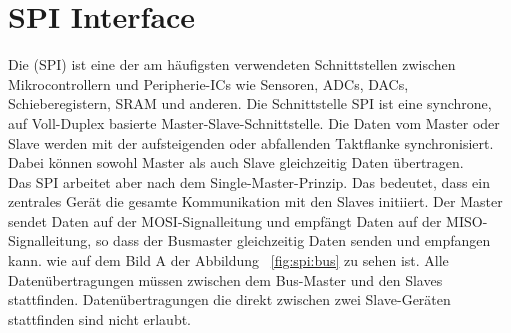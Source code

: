 \section{SPI Interface}
\label{sec:SPI:Interface}

Die  (SPI) ist eine der am häufigsten verwendeten Schnittstellen zwischen Mikrocontrollern und Peripherie-ICs wie Sensoren, ADCs, DACs, Schieberegistern, SRAM und anderen. 
Die Schnittstelle SPI ist eine synchrone, auf Voll-Duplex basierte Master-Slave-Schnittstelle. Die Daten vom Master oder Slave werden mit der aufsteigenden oder abfallenden Taktflanke synchronisiert. Dabei können sowohl Master als auch Slave gleichzeitig Daten übertragen. \\
Das SPI arbeitet aber nach dem Single-Master-Prinzip. Das bedeutet, dass ein zentrales Gerät die gesamte Kommunikation mit den Slaves initiiert. Der Master sendet Daten auf der MOSI-Signalleitung und empfängt Daten auf der MISO-Signalleitung, so dass der Busmaster gleichzeitig Daten senden und empfangen kann. wie auf dem Bild A der Abbildung ~\ref{fig:spi:bus} zu sehen ist. Alle Datenübertragungen müssen zwischen dem Bus-Master und den Slaves stattfinden. Datenübertragungen die direkt zwischen zwei Slave-Geräten stattfinden  sind nicht erlaubt. 

